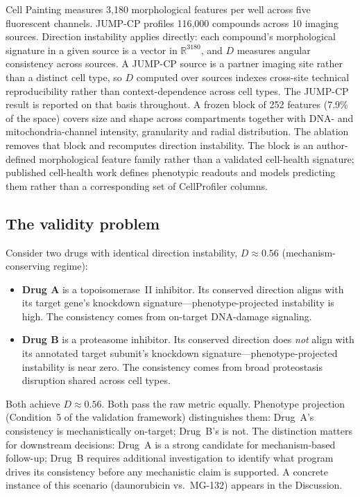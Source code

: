 \documentclass[11pt]{article}
\begin{document}
Cell Painting \citep{bray2016cell,chandrasekaran2023jump} measures 3{,}180 morphological
features per well across five fluorescent channels. JUMP-CP
profiles 116{,}000 compounds across 10 imaging sources. Direction
instability applies directly: each compound's morphological signature in a
given source is a vector in $\mathbb{R}^{3180}$, and $D$ measures angular
consistency across sources. A JUMP-CP source is a partner imaging site
rather than a distinct cell type, so $D$ computed over sources indexes
cross-site technical reproducibility rather than context-dependence across
cell types. The JUMP-CP result is reported on that basis throughout. A frozen block of
252 features (7.9\% of the space) covers size and shape across compartments
together with DNA- and mitochondria-channel intensity, granularity and
radial distribution. The ablation removes that block and recomputes
direction instability. The block is an author-defined morphological feature
family rather than a validated cell-health signature; published cell-health
work defines phenotypic readouts and models predicting them rather than a
corresponding set of CellProfiler columns.

\subsection{The validity problem}

Consider two drugs with identical direction instability, $D \approx 0.56$
(mechanism-conserving regime):

\begin{itemize}
  \item \textbf{Drug A} is a topoisomerase~II inhibitor. Its conserved
    direction aligns with its target gene's knockdown
    signature---phenotype-projected instability is high. The consistency comes
    from on-target DNA-damage signaling.
  \item \textbf{Drug B} is a proteasome inhibitor. Its conserved direction
    does \emph{not} align with its annotated target subunit's knockdown
    signature---phenotype-projected instability is near zero. The consistency
    comes from broad proteostasis disruption shared across cell types.
\end{itemize}

Both achieve $D \approx 0.56$. Both pass the raw metric equally. Phenotype
projection (Condition~5 of the validation framework) distinguishes them: Drug~A's
consistency is mechanistically on-target; Drug~B's is not. The distinction
matters for downstream decisions: Drug~A is a strong candidate for
mechanism-based follow-up; Drug~B requires additional investigation to
identify what program drives its consistency before any mechanistic claim
is supported. A concrete instance of this scenario (daunorubicin vs.\
MG-132) appears in the Discussion.
\end{document}
